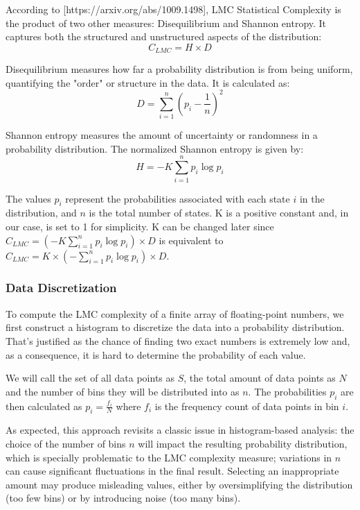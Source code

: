     According to [https://arxiv.org/abs/1009.1498], LMC Statistical Complexity is the product of two other measures: Disequilibrium and Shannon entropy. It captures both the structured and unstructured aspects of the distribution:
    \[ C_{LMC} = H \times D \]

    Disequilibrium measures how far a probability distribution is from being uniform, quantifying the "order" or structure in the data. It is calculated as:
    \[ D = \sum_{i=1}^{n} \left(p_i - \frac{1}{n}\right)^2 \]

    Shannon entropy measures the amount of uncertainty or randomness in a probability distribution. The normalized Shannon entropy is given by:
    \[ H = -K \sum_{i=1}^{n} p_i \log p_i \]

    The values \( p_i \) represent the probabilities associated with each state \( i \) in the distribution, and \( n \) is the total number of states. K is a positive constant and, in our case, is set to 1 for simplicity. K can be changed later since \( C_{LMC} = (-K \sum_{i=1}^{n} p_i \log p_i)  \times D \) is equivalent to \( C_{LMC} = K \times (- \sum_{i=1}^{n} p_i \log p_i)  \times D \).

    \subsubsection{Data Discretization}

        To compute the LMC complexity of a finite array of floating-point numbers, we first construct a histogram to discretize the data into a probability distribution. That's justified as the chance of finding two exact numbers is extremely low and, as a consequence, it is hard to determine the probability of each value. 
        
        We will call the set of all data points as \( S \), the total amount of data points as \( N \) and the number of bins they will be distributed into as \( n \). The probabilities \( p_i \) are then calculated as \( p_i = \frac{f_i}{N} \) where \( f_i \) is the frequency count of data points in bin \( i \).

        As expected, this approach revisits a classic issue in histogram-based analysis: the choice of the number of bins \( n \) will impact the resulting probability distribution, which is specially problematic to the LMC complexity measure; variations in \( n \) can cause significant fluctuations in the final result. Selecting an inappropriate amount may produce misleading values, either by oversimplifying the distribution (too few bins) or by introducing noise (too many bins). 


